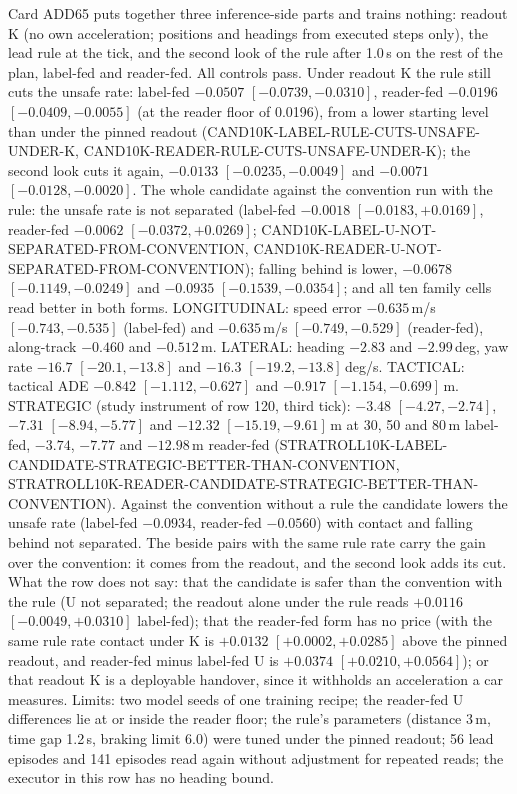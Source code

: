\documentclass[10pt,twocolumn]{article}
\makeatletter
\theoremstyle{remark}
\renewcommand\paragraph{\@startsection{paragraph}{4}{\z@}{1.6ex \@plus .5ex \@minus .2ex}{-1em}{\normalfont\normalsize\bfseries}}
\makeatother
\begin{document}
\paragraph{The inference-side candidate (row 121, H-V8F-PROOF-121).} Card ADD65 puts together three inference-side parts and trains nothing: readout K (no own acceleration; positions and headings from executed steps only), the lead rule at the tick, and the second look of the rule after 1.0\,s on the rest of the plan, label-fed and reader-fed. All controls pass. Under readout K the rule still cuts the unsafe rate: label-fed $-0.0507$ $[-0.0739,-0.0310]$, reader-fed $-0.0196$ $[-0.0409,-0.0055]$ (at the reader floor of 0.0196), from a lower starting level than under the pinned readout (CAND10K-LABEL-RULE-CUTS-UNSAFE-UNDER-K, CAND10K-READER-RULE-CUTS-UNSAFE-UNDER-K); the second look cuts it again, $-0.0133$ $[-0.0235,-0.0049]$ and $-0.0071$ $[-0.0128,-0.0020]$. The whole candidate against the convention run with the rule: the unsafe rate is not separated (label-fed $-0.0018$ $[-0.0183,+0.0169]$, reader-fed $-0.0062$ $[-0.0372,+0.0269]$; CAND10K-LABEL-U-NOT-SEPARATED-FROM-CONVENTION, CAND10K-READER-U-NOT-SEPARATED-FROM-CONVENTION); falling behind is lower, $-0.0678$ $[-0.1149,-0.0249]$ and $-0.0935$ $[-0.1539,-0.0354]$; and all ten family cells read better in both forms. LONGITUDINAL: speed error $-0.635$\,m/s $[-0.743,-0.535]$ (label-fed) and $-0.635$\,m/s $[-0.749,-0.529]$ (reader-fed), along-track $-0.460$ and $-0.512$\,m. LATERAL: heading $-2.83$ and $-2.99$\,deg, yaw rate $-16.7$ $[-20.1,-13.8]$ and $-16.3$ $[-19.2,-13.8]$\,deg/s. TACTICAL: tactical ADE $-0.842$ $[-1.112,-0.627]$ and $-0.917$ $[-1.154,-0.699]$\,m. STRATEGIC (study instrument of row 120, third tick): $-3.48$ $[-4.27,-2.74]$, $-7.31$ $[-8.94,-5.77]$ and $-12.32$ $[-15.19,-9.61]$\,m at 30, 50 and 80\,m label-fed, $-3.74$, $-7.77$ and $-12.98$\,m reader-fed (STRATROLL10K-LABEL-CANDIDATE-STRATEGIC-BETTER-THAN-CONVENTION, STRATROLL10K-READER-CANDIDATE-STRATEGIC-BETTER-THAN-CONVENTION). Against the convention without a rule the candidate lowers the unsafe rate (label-fed $-0.0934$, reader-fed $-0.0560$) with contact and falling behind not separated. The beside pairs with the same rule rate carry the gain over the convention: it comes from the readout, and the second look adds its cut. What the row does not say: that the candidate is safer than the convention with the rule (U not separated; the readout alone under the rule reads $+0.0116$ $[-0.0049,+0.0310]$ label-fed); that the reader-fed form has no price (with the same rule rate contact under K is $+0.0132$ $[+0.0002,+0.0285]$ above the pinned readout, and reader-fed minus label-fed U is $+0.0374$ $[+0.0210,+0.0564]$); or that readout K is a deployable handover, since it withholds an acceleration a car measures. Limits: two model seeds of one training recipe; the reader-fed U differences lie at or inside the reader floor; the rule's parameters (distance 3\,m, time gap 1.2\,s, braking limit 6.0) were tuned under the pinned readout; 56 lead episodes and 141 episodes read again without adjustment for repeated reads; the executor in this row has no heading bound.
\end{document}
